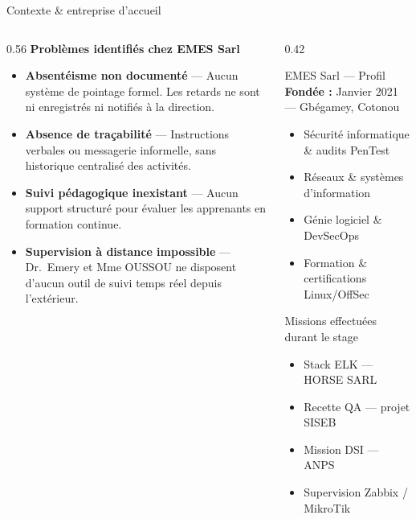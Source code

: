 \documentclass[aspectratio=169, 10pt]{beamer}
\begin{document}
\begin{frame}{Contexte \& entreprise d'accueil}
  \begin{columns}[T]
    \begin{column}{0.56\textwidth}
      \textbf{\textcolor{EMESblue}{\small Problèmes identifiés chez EMES Sarl}}
      \vspace{0.2cm}

      \begin{itemize}\setlength\itemsep{6pt}
        \item \textbf{Absentéisme non documenté} ---
          Aucun système de pointage formel. Les retards ne sont ni enregistrés ni notifiés à la direction.

        \item \textbf{Absence de traçabilité} ---
          Instructions verbales ou messagerie informelle, sans historique centralisé des activités.

        \item \textbf{Suivi pédagogique inexistant} ---
          Aucun support structuré pour évaluer les apprenants en formation continue.

        \item \textbf{Supervision à distance impossible} ---
          Dr.~Emery et Mme OUSSOU ne disposent d'aucun outil de suivi temps réel depuis l'extérieur.
      \end{itemize}
    \end{column}
    \begin{column}{0.42\textwidth}
      \begin{block}{EMES Sarl --- Profil}
        \scriptsize
        \textbf{Fondée :} Janvier 2021 --- Gbégamey, Cotonou\\[4pt]
        \begin{itemize}\setlength\itemsep{3pt}
          \item Sécurité informatique \& audits PenTest
          \item Réseaux \& systèmes d'information
          \item Génie logiciel \& DevSecOps
          \item Formation \& certifications Linux/OffSec
        \end{itemize}
      \end{block}
      \vspace{0.3cm}
      \begin{exampleblock}{Missions effectuées durant le stage}
        \scriptsize
        \begin{itemize}\setlength\itemsep{2pt}
          \item Stack ELK --- HORSE SARL
          \item Recette QA --- projet SISEB
          \item Mission DSI --- ANPS
          \item Supervision Zabbix / MikroTik
        \end{itemize}
      \end{exampleblock}
    \end{column}
  \end{columns}
\end{frame}
\end{document}
